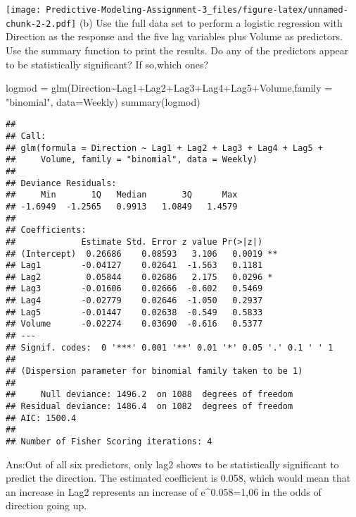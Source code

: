 \documentclass[
]{article}
\newenvironment{Shaded}{\begin{snugshade}}{\end{snugshade}}
\newcommand{\AttributeTok}[1]{\textcolor[rgb]{0.77,0.63,0.00}{#1}}
\newcommand{\FunctionTok}[1]{\textcolor[rgb]{0.00,0.00,0.00}{#1}}
\newcommand{\NormalTok}[1]{#1}
\newcommand{\OtherTok}[1]{\textcolor[rgb]{0.56,0.35,0.01}{#1}}
\newcommand{\SpecialCharTok}[1]{\textcolor[rgb]{0.00,0.00,0.00}{#1}}
\newcommand{\StringTok}[1]{\textcolor[rgb]{0.31,0.60,0.02}{#1}}
\begin{document}
\texttt{[image: Predictive-Modeling-Assignment-3\_files/figure-latex/unnamed-chunk-2-2.pdf]}
(b) Use the full data set to perform a logistic regression with
Direction as the response and the five lag variables plus Volume as
predictors. Use the summary function to print the results. Do any of the
predictors appear to be statistically significant? If so,which ones?

\begin{Shaded}
\begin{Highlighting}[]
\NormalTok{logmod }\OtherTok{=} \FunctionTok{glm}\NormalTok{(Direction}\SpecialCharTok{\textasciitilde{}}\NormalTok{Lag1}\SpecialCharTok{+}\NormalTok{Lag2}\SpecialCharTok{+}\NormalTok{Lag3}\SpecialCharTok{+}\NormalTok{Lag4}\SpecialCharTok{+}\NormalTok{Lag5}\SpecialCharTok{+}\NormalTok{Volume,}\AttributeTok{family =} \StringTok{"binomial"}\NormalTok{, }\AttributeTok{data=}\NormalTok{Weekly)}
\FunctionTok{summary}\NormalTok{(logmod)}
\end{Highlighting}
\end{Shaded}

\begin{verbatim}
## 
## Call:
## glm(formula = Direction ~ Lag1 + Lag2 + Lag3 + Lag4 + Lag5 + 
##     Volume, family = "binomial", data = Weekly)
## 
## Deviance Residuals: 
##     Min       1Q   Median       3Q      Max  
## -1.6949  -1.2565   0.9913   1.0849   1.4579  
## 
## Coefficients:
##             Estimate Std. Error z value Pr(>|z|)   
## (Intercept)  0.26686    0.08593   3.106   0.0019 **
## Lag1        -0.04127    0.02641  -1.563   0.1181   
## Lag2         0.05844    0.02686   2.175   0.0296 * 
## Lag3        -0.01606    0.02666  -0.602   0.5469   
## Lag4        -0.02779    0.02646  -1.050   0.2937   
## Lag5        -0.01447    0.02638  -0.549   0.5833   
## Volume      -0.02274    0.03690  -0.616   0.5377   
## ---
## Signif. codes:  0 '***' 0.001 '**' 0.01 '*' 0.05 '.' 0.1 ' ' 1
## 
## (Dispersion parameter for binomial family taken to be 1)
## 
##     Null deviance: 1496.2  on 1088  degrees of freedom
## Residual deviance: 1486.4  on 1082  degrees of freedom
## AIC: 1500.4
## 
## Number of Fisher Scoring iterations: 4
\end{verbatim}

Ans:Out of all six predictors, only lag2 shows to be statistically
significant to predict the direction. The estimated coefficient is
0.058, which would mean that an increase in Lag2 represents an increase
of e\^{}0.058=1,06 in the odds of direction going up.
\end{document}
